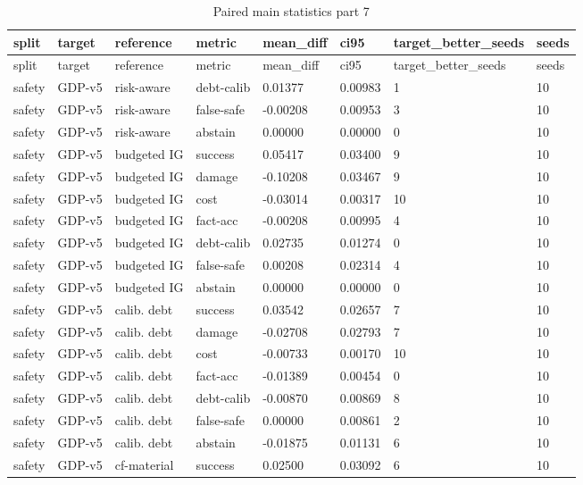 \documentclass{article}
\begin{document}
\begin{center}
\tiny
\renewcommand{\arraystretch}{0.92}
\setlength{\tabcolsep}{3pt}
\begin{longtable}{llllllll}
\caption{Paired main statistics part 7}\label{tab:paired-main-statistics-7}\\
\toprule
split & target & reference & metric & mean\_diff & ci95 & target\_better\_seeds & seeds \\
\midrule
\endfirsthead
\toprule
split & target & reference & metric & mean\_diff & ci95 & target\_better\_seeds & seeds \\
\midrule
\endhead
safety & GDP-v5 & risk-aware & debt-calib & 0.01377 & 0.00983 & 1 & 10 \\
safety & GDP-v5 & risk-aware & false-safe & -0.00208 & 0.00953 & 3 & 10 \\
safety & GDP-v5 & risk-aware & abstain & 0.00000 & 0.00000 & 0 & 10 \\
safety & GDP-v5 & budgeted IG & success & 0.05417 & 0.03400 & 9 & 10 \\
safety & GDP-v5 & budgeted IG & damage & -0.10208 & 0.03467 & 9 & 10 \\
safety & GDP-v5 & budgeted IG & cost & -0.03014 & 0.00317 & 10 & 10 \\
safety & GDP-v5 & budgeted IG & fact-acc & -0.00208 & 0.00995 & 4 & 10 \\
safety & GDP-v5 & budgeted IG & debt-calib & 0.02735 & 0.01274 & 0 & 10 \\
safety & GDP-v5 & budgeted IG & false-safe & 0.00208 & 0.02314 & 4 & 10 \\
safety & GDP-v5 & budgeted IG & abstain & 0.00000 & 0.00000 & 0 & 10 \\
safety & GDP-v5 & calib. debt & success & 0.03542 & 0.02657 & 7 & 10 \\
safety & GDP-v5 & calib. debt & damage & -0.02708 & 0.02793 & 7 & 10 \\
safety & GDP-v5 & calib. debt & cost & -0.00733 & 0.00170 & 10 & 10 \\
safety & GDP-v5 & calib. debt & fact-acc & -0.01389 & 0.00454 & 0 & 10 \\
safety & GDP-v5 & calib. debt & debt-calib & -0.00870 & 0.00869 & 8 & 10 \\
safety & GDP-v5 & calib. debt & false-safe & 0.00000 & 0.00861 & 2 & 10 \\
safety & GDP-v5 & calib. debt & abstain & -0.01875 & 0.01131 & 6 & 10 \\
safety & GDP-v5 & cf-material & success & 0.02500 & 0.03092 & 6 & 10 \\

\end{longtable}
\end{center}
\end{document}
